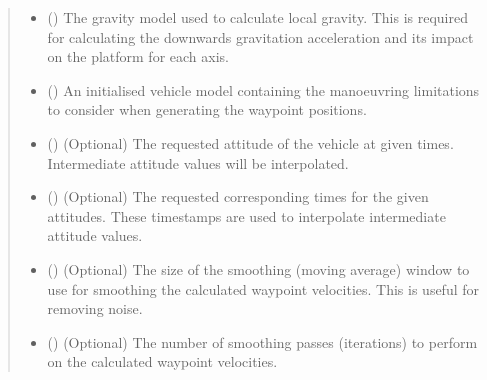 \documentclass[letterpaper,10pt,english]{sphinxmanual}
\begin{document}
\begin{fulllineitems}
\begin{quote}
\begin{description}
\begin{itemize}
\item {} 
\sphinxAtStartPar
{} ({\hyperref[\detokenize{modules/gravity/base:qnav.gravity.base.GravityModel}]{}}) \textendash{} The gravity model used to calculate local gravity.
This is required for calculating the downwards gravitation
acceleration and its impact on the platform for each axis.

\item {} 
\sphinxAtStartPar
{} ({\hyperref[\detokenize{modules/waypoints/vehicle:qnav.waypoints.vehicle.Vehicle}]{}}) \textendash{} An initialised vehicle model containing the
manoeuvring limitations to consider when generating the waypoint
positions.

\item {} 
\sphinxAtStartPar
{} (\sphinxstyleliteralemphasis{\sphinxupquote{ (}}\sphinxstyleliteralemphasis{\sphinxupquote{)}}) \textendash{} (Optional) The requested attitude of the vehicle at
given times. Intermediate attitude values will be interpolated.

\item {} 
\sphinxAtStartPar
{} (\sphinxstyleliteralemphasis{\sphinxupquote{ (}}\sphinxstyleliteralemphasis{\sphinxupquote{)}}) \textendash{} (Optional) The requested corresponding times for
the given attitudes. These timestamps are used to interpolate
intermediate attitude values.

\item {} 
\sphinxAtStartPar
{} () \textendash{} (Optional) The size of the smoothing
(moving average) window to use for smoothing the calculated
waypoint velocities. This is useful for removing noise.

\item {} 
\sphinxAtStartPar
{} () \textendash{} (Optional) The number of smoothing passes
(iterations) to perform on the calculated waypoint velocities.


\end{itemize}
\end{description}
\end{quote}
\end{fulllineitems}
\end{document}
